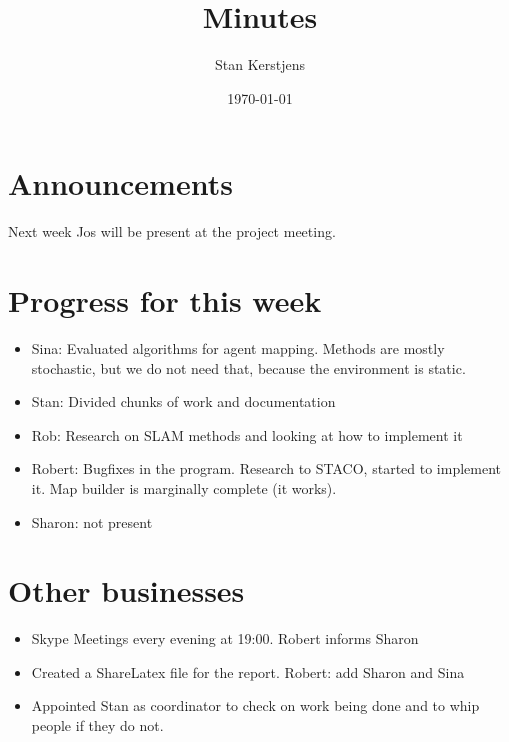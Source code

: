 \documentclass{article}
\title{Minutes}
\author{Stan Kerstjens}
\date{\today}
\begin{document}
\section{Announcements}
	Next week Jos will be present at the project meeting.

\section{Progress for this week}
	\begin{itemize}
		\item Sina: Evaluated algorithms for agent mapping. Methods are mostly stochastic, but we do not need that, because the environment is static.
		\item Stan: Divided chunks of work and documentation
		\item Rob: Research on SLAM methods and looking at how to implement it
		\item Robert: Bugfixes in the program. Research to STACO, started to implement it. Map builder is marginally complete (it works).
		\item Sharon: not present
	\end{itemize}

\section{Other businesses}
	\begin{itemize}
	\item Skype Meetings every evening at 19:00.
		\subitem Robert informs Sharon

	\item Created a ShareLatex file for the report.
		\subitem Robert: add Sharon and Sina

	\item Appointed Stan as coordinator to check on work being done and to whip people if they do not.
	\end{itemize}
\end{document}
